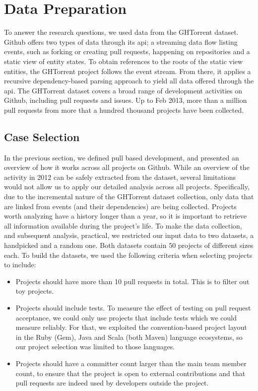 \documentclass{sig-alternate}
\begin{document}
\section{Data Preparation}

To answer the research questions, we used data from the GHTorrent dataset.
Github offers two types of data through its {\sc api}; a streaming data flow
listing events, such as forking or creating pull requests, happening on
repositories and a static view of entity states. To obtain references to the
roots of the static view entities, the GHTorrent project follows the event
stream. From there, it applies a recursive dependency-based parsing approach to
yield all data offered through the {\sc api}. The GHTorrent dataset covers a
broad range of development activities on Github, including pull requests and
issues. Up to Feb 2013, more than a million pull requests from more that a
hundred thousand projects have been collected.

\subsection{Case Selection}

In the previous section, we defined pull based development, and presented an
overview of how it works across all projects on Github. While an overview of
the activity in 2012 can be safely extracted from the dataset, several
limitations would not allow us to apply our detailed analysis across all
projects. Specifically, due to the incremental nature of the GHTorrent dataset
collection, only data that are linked from events (and their dependencies) are
being collected. Projects worth analyzing have a history longer than a year, so
it is important to retrieve all information available during the project's
life. To make the data collection, and subsequent analysis, practical, we
restricted our input data to two datasets, a \textsf{handpicked} and a
\textsf{random} one. Both datasets contain 50 projects of different sizes
each. To build the datasets, we used the following criteria when selecting
projects to include:

\begin{itemize}

  \item Projects should have more than 10 pull requests in total. This is
    to filter out toy projects. 

  \item Projects should include tests. To measure the effect of testing on pull
    request acceptance, we could only use projects that include tests which we
    could measure reliably. For that, we exploited the convention-based project
    layout in the Ruby (Gem), Java and Scala (both Maven) language ecosystems,
    so our project selection was limited to those languages. 

  \item Projects should have a committer count larger than the main team member
    count, to ensure that the project is open to external contributions and that
    pull requests are indeed used by developers outside the project.

\end{itemize}
\end{document}
